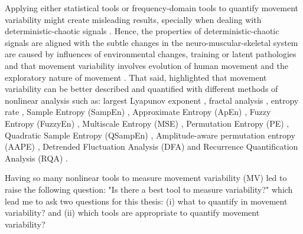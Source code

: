 Applying either statistical tools or frequency-domain tools 
to quantify movement variability might create misleading results, 
specially when dealing with deterministic-chaotic signals
\citep{amato1992, dingwell2000, dingwell2007, miller2006}.
Hence, the properties of deterministic-chaotic signals  
are aligned with the subtle changes in the neuro-muscular-skeletal system 
are caused by influences of environmental changes, training or latent 
pathologies \citep{preatoni2010, preatoni2013}
and that movement variability involves evolution of human movement and 
the exploratory nature of movement \citep{stergiou2011, caballero2014}. 
That said, \cite{stergiou2011, preatoni2010, caballero2014} 
highlighted that movement variability can be better described and quantified 
with different methods of nonlinear analysis such as: 
largest Lyapunov exponent \citep{bruijn2009, donker2007, kurz2010b, 
yang2011},
fractal analysis \citep{delignleres2003},
entropy rate \citep{cavanaugh2010},
Sample Entropy (SampEn)  \citep{richman2000, donker2007, liao2008, 
stins2009, vaillancourt2004},
Approximate Entropy (ApEn) \citep{pincus1991, kurz2010a, sosnoff2006, 
sosnoff2009, cavanaugh2010},
Fuzzy Entropy (FuzzyEn) \citep{chen2007},
Multiscale Entropy (MSE) \citep{costa2002},
Permutation Entropy (PE) \citep{bandt2002, vakharia2015},
Quadratic Sample Entropy (QSampEn) \citep{lake2011},
Amplitude-aware permutation entropy (AAPE) \citep{azami2016},
Detrended Fluctuation Analysis (DFA) \citep{gates2007, gates2008, 
hausdorff200} and 
Recurrence Quantification Analysis (RQA) \citep{zbilut1992, trulla1996, 
marwan2008}.

Having so many nonlinear tools to measure movement variability (MV) 
led \citealt[p. 67]{caballero2014} to raise the following question: 
"Is there a best tool to measure variability?" which lead me to ask
two questions for this thesis: (i) what to quantify in movement variability? 
and (ii) which tools are appropriate to quantify movement variability?

